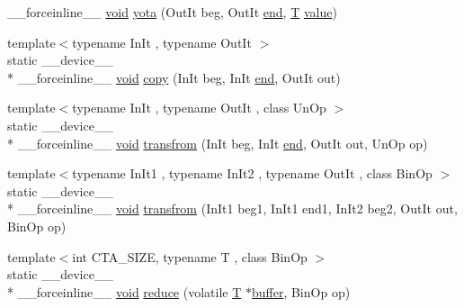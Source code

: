 \begin{DoxyCompactItemize}
\-\_\-\-\_\-forceinline\-\_\-\-\_\- \hyperlink{legacy_8hpp_a8bb47f092d473522721002c86c13b94e}{void} \hyperlink{structcv_1_1gpu_1_1device_1_1Block_aa2f0873e622ee00fbf67fe84519abac6}{yota} (Out\-It beg, Out\-It \hyperlink{legacy_8hpp_ab21668ff869102944cbf3bb534bba27d}{end}, \hyperlink{calib3d_8hpp_a3efb9551a871ddd0463079a808916717}{T} \hyperlink{highgui__c_8h_ad4670c92695d4327c21292905a803901}{value})
\item 
{\footnotesize template$<$typename In\-It , typename Out\-It $>$ }\\static \-\_\-\-\_\-device\-\_\-\-\_\- \\*
\-\_\-\-\_\-forceinline\-\_\-\-\_\- \hyperlink{legacy_8hpp_a8bb47f092d473522721002c86c13b94e}{void} \hyperlink{structcv_1_1gpu_1_1device_1_1Block_a7f2a0d499f5b042f00d0c1d2c65a2702}{copy} (In\-It beg, In\-It \hyperlink{legacy_8hpp_ab21668ff869102944cbf3bb534bba27d}{end}, Out\-It out)
\item 
{\footnotesize template$<$typename In\-It , typename Out\-It , class Un\-Op $>$ }\\static \-\_\-\-\_\-device\-\_\-\-\_\- \\*
\-\_\-\-\_\-forceinline\-\_\-\-\_\- \hyperlink{legacy_8hpp_a8bb47f092d473522721002c86c13b94e}{void} \hyperlink{structcv_1_1gpu_1_1device_1_1Block_ad8b2a8af26a13a0d5dfeff2e2cbdfb00}{transfrom} (In\-It beg, In\-It \hyperlink{legacy_8hpp_ab21668ff869102944cbf3bb534bba27d}{end}, Out\-It out, Un\-Op op)
\item 
{\footnotesize template$<$typename In\-It1 , typename In\-It2 , typename Out\-It , class Bin\-Op $>$ }\\static \-\_\-\-\_\-device\-\_\-\-\_\- \\*
\-\_\-\-\_\-forceinline\-\_\-\-\_\- \hyperlink{legacy_8hpp_a8bb47f092d473522721002c86c13b94e}{void} \hyperlink{structcv_1_1gpu_1_1device_1_1Block_a5de59efbcba782a331737341dc75c16e}{transfrom} (In\-It1 beg1, In\-It1 end1, In\-It2 beg2, Out\-It out, Bin\-Op op)
\item 
{\footnotesize template$<$int C\-T\-A\-\_\-\-S\-I\-Z\-E, typename T , class Bin\-Op $>$ }\\static \-\_\-\-\_\-device\-\_\-\-\_\- \\*
\-\_\-\-\_\-forceinline\-\_\-\-\_\- \hyperlink{legacy_8hpp_a8bb47f092d473522721002c86c13b94e}{void} \hyperlink{structcv_1_1gpu_1_1device_1_1Block_adfa6e86395d83c9f546609b0314c0ef2}{reduce} (volatile \hyperlink{calib3d_8hpp_a3efb9551a871ddd0463079a808916717}{T} $\ast$\hyperlink{legacy_8hpp_ac4a77e2a1d3f8442ce13847f9c3025b9}{buffer}, Bin\-Op op)

\end{DoxyCompactItemize}
